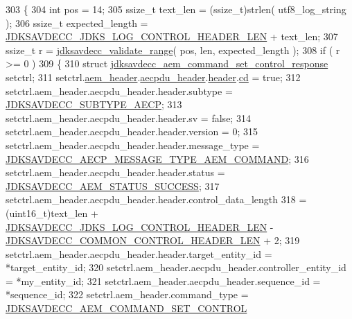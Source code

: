 \begin{DoxyCode}
303 \{
304     \textcolor{keywordtype}{int} pos = 14;
305     ssize\_t text\_len = (ssize\_t)strlen( utf8\_log\_string );
306     ssize\_t expected\_length = \hyperlink{group__jdks__log_gaade756dffaac6e4f6d3d3b16e4cea38b}{JDKSAVDECC\_JDKS\_LOG\_CONTROL\_HEADER\_LEN} 
      + text\_len;
307     ssize\_t r = \hyperlink{group__util_ga9c02bdfe76c69163647c3196db7a73a1}{jdksavdecc\_validate\_range}( pos, len, expected\_length );
308     \textcolor{keywordflow}{if} ( r >= 0 )
309     \{
310         \textcolor{keyword}{struct }\hyperlink{structjdksavdecc__aem__command__set__control__response}{jdksavdecc\_aem\_command\_set\_control\_response} 
      setctrl;
311         setctrl.\hyperlink{structjdksavdecc__aem__command__set__control__response_ae1e77ccb75ff5021ad923221eab38294}{aem\_header}.\hyperlink{structjdksavdecc__aecpdu__aem_ae8460ae179666e7ce268ed1ef33d0de3}{aecpdu\_header}.\hyperlink{structjdksavdecc__aecpdu__common_a314cacb6a61bcf18749030c0b6fb7510}{header}.\hyperlink{structjdksavdecc__aecpdu__common__control__header_a8bdacfca3faaf5f7d020bbe533855525}{cd} = \textcolor{keyword}{true};
312         setctrl.aem\_header.aecpdu\_header.header.subtype = 
      \hyperlink{group__subtype_ga4f1d76227a738f442d15ebaf2253b6b3}{JDKSAVDECC\_SUBTYPE\_AECP};
313         setctrl.aem\_header.aecpdu\_header.header.sv = \textcolor{keyword}{false};
314         setctrl.aem\_header.aecpdu\_header.header.version = 0;
315         setctrl.aem\_header.aecpdu\_header.header.message\_type = 
      \hyperlink{group__aecp__message__type_ga4625ce189cc209f42deb0629f48faf69}{JDKSAVDECC\_AECP\_MESSAGE\_TYPE\_AEM\_COMMAND};
316         setctrl.aem\_header.aecpdu\_header.header.status = 
      \hyperlink{group__aecpdu__aem__status_gaa4d43ea279e119485de1282522a7fb67}{JDKSAVDECC\_AEM\_STATUS\_SUCCESS};
317         setctrl.aem\_header.aecpdu\_header.header.control\_data\_length
318             = (uint16\_t)text\_len + \hyperlink{group__jdks__log_gaade756dffaac6e4f6d3d3b16e4cea38b}{JDKSAVDECC\_JDKS\_LOG\_CONTROL\_HEADER\_LEN}
       - \hyperlink{group__jdksavdecc__avtp__common__control__header_gaae84052886fb1bb42f3bc5f85b741dff}{JDKSAVDECC\_COMMON\_CONTROL\_HEADER\_LEN} + 2;
319         setctrl.aem\_header.aecpdu\_header.header.target\_entity\_id = *target\_entity\_id;
320         setctrl.aem\_header.aecpdu\_header.controller\_entity\_id = *my\_entity\_id;
321         setctrl.aem\_header.aecpdu\_header.sequence\_id = *sequence\_id;
322         setctrl.aem\_header.command\_type = \hyperlink{group__command_ga78648020206806d2992e010573f0ef27}{JDKSAVDECC\_AEM\_COMMAND\_SET\_CONTROL}

\end{DoxyCode}
